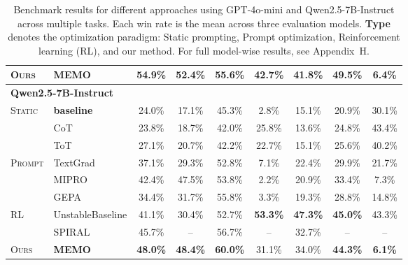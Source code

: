 \begin{table}[t]
{\begin{tabular}{l l c c c c c c c}
\rowcolor{OursBlue}
\textsc{Ours} & \textbf{MEMO} & \textbf{54.9\%} & \textbf{52.4\%} & \textbf{55.6\%} & \textbf{42.7\%} & \textbf{41.8\%} & \textbf{49.5\%} & \textbf{6.4\%} \\

\midrule
\multicolumn{9}{l}{\textbf{Qwen2.5-7B-Instruct}} \\
\addlinespace[0.3em]

\rowcolor{StaticGroup}
\textsc{Static} & \textbf{baseline} & 24.0\% & 17.1\% & 45.3\% & 2.8\% & 15.1\% & 20.9\% & 30.1\% \\
\rowcolor{StaticGroup}
& CoT & 23.8\% & 18.7\% & 42.0\% & 25.8\% & 13.6\% & 24.8\% & 43.4\% \\
\rowcolor{StaticGroup}
& ToT & 27.1\% & 20.7\% & 42.2\% & 22.7\% & 15.1\% & 25.6\% & 40.2\% \\

\rowcolor{OptGroup}
\textsc{Prompt} & TextGrad & 37.1\% & 29.3\% & 52.8\% & 7.1\% & 22.4\% & 29.9\% & 21.7\% \\
\rowcolor{OptGroup}
& MIPRO & 42.4\% & 47.5\% & 53.8\% & 2.2\% & 20.9\% & 33.4\% & 7.3\% \\
\rowcolor{OptGroup}
& GEPA & 34.4\% & 31.7\% & 55.8\% & 3.3\% & 19.3\% & 28.8\% & 14.8\% \\

\rowcolor{RLGroup}
\textsc{RL} & UnstableBaseline & 41.1\% & 30.4\% & 52.7\% & \textbf{53.3\%} & \textbf{47.3\%} & \textbf{45.0\%} & 43.3\% \\
\rowcolor{RLGroup}
& SPIRAL & 45.7\% & -- & 56.7\% & -- & 32.7\% & -- & -- \\

\rowcolor{OursBlue}
\textsc{Ours} & \textbf{MEMO} & \textbf{48.0\%} & \textbf{48.4\%} & \textbf{60.0\%} & 31.1\% & 34.0\% & \textbf{44.3\%} & \textbf{6.1\%} \\

\bottomrule
\end{tabular}
}
\caption{Benchmark results for different approaches using GPT-4o-mini and Qwen2.5-7B-Instruct across multiple tasks. Each win rate is the mean across three evaluation models. \textbf{Type} denotes the optimization paradigm: Static prompting, Prompt optimization, Reinforcement learning (RL), and our method. For full model-wise results, see Appendix~H.}
\label{tab:main-results_v2}
\end{table}



